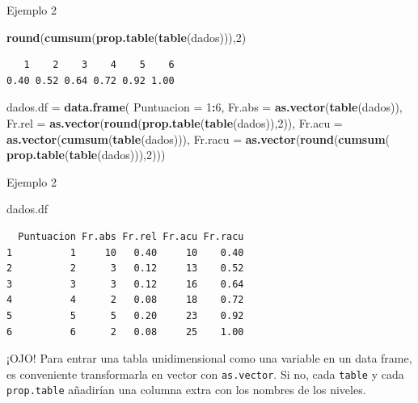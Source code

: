 \documentclass[
  ignorenonframetext,
  aspectratio=169]{beamer}
\newenvironment{Shaded}{\begin{snugshade}}{\end{snugshade}}
\newcommand{\AttributeTok}[1]{\textcolor[rgb]{0.13,0.29,0.53}{#1}}
\newcommand{\DecValTok}[1]{\textcolor[rgb]{0.00,0.00,0.81}{#1}}
\newcommand{\FunctionTok}[1]{\textcolor[rgb]{0.13,0.29,0.53}{\textbf{#1}}}
\newcommand{\NormalTok}[1]{#1}
\newcommand{\OtherTok}[1]{\textcolor[rgb]{0.56,0.35,0.01}{#1}}
\newcommand{\SpecialCharTok}[1]{\textcolor[rgb]{0.81,0.36,0.00}{\textbf{#1}}}
\begin{document}
\begin{frame}[fragile]{Ejemplo 2}
\label{ejemplo-2-4}
\begin{Shaded}
\begin{Highlighting}[]
\FunctionTok{round}\NormalTok{(}\FunctionTok{cumsum}\NormalTok{(}\FunctionTok{prop.table}\NormalTok{(}\FunctionTok{table}\NormalTok{(dados))),}\DecValTok{2}\NormalTok{)}
\end{Highlighting}
\end{Shaded}

\begin{verbatim}
   1    2    3    4    5    6 
0.40 0.52 0.64 0.72 0.92 1.00 
\end{verbatim}

\begin{Shaded}
\begin{Highlighting}[]
\NormalTok{dados.df }\OtherTok{=} \FunctionTok{data.frame}\NormalTok{(}
  \AttributeTok{Puntuacion =} \DecValTok{1}\SpecialCharTok{:}\DecValTok{6}\NormalTok{,}
  \AttributeTok{Fr.abs =} \FunctionTok{as.vector}\NormalTok{(}\FunctionTok{table}\NormalTok{(dados)),}
  \AttributeTok{Fr.rel =} \FunctionTok{as.vector}\NormalTok{(}\FunctionTok{round}\NormalTok{(}\FunctionTok{prop.table}\NormalTok{(}\FunctionTok{table}\NormalTok{(dados)),}\DecValTok{2}\NormalTok{)),}
  \AttributeTok{Fr.acu =} \FunctionTok{as.vector}\NormalTok{(}\FunctionTok{cumsum}\NormalTok{(}\FunctionTok{table}\NormalTok{(dados))),}
  \AttributeTok{Fr.racu =} \FunctionTok{as.vector}\NormalTok{(}\FunctionTok{round}\NormalTok{(}\FunctionTok{cumsum}\NormalTok{(}
    \FunctionTok{prop.table}\NormalTok{(}\FunctionTok{table}\NormalTok{(dados))),}\DecValTok{2}\NormalTok{)))}
\end{Highlighting}
\end{Shaded}
\end{frame}

\begin{frame}[fragile]{Ejemplo 2}
\label{ejemplo-2-5}
\begin{Shaded}
\begin{Highlighting}[]
\NormalTok{dados.df}
\end{Highlighting}
\end{Shaded}

\begin{verbatim}
  Puntuacion Fr.abs Fr.rel Fr.acu Fr.racu
1          1     10   0.40     10    0.40
2          2      3   0.12     13    0.52
3          3      3   0.12     16    0.64
4          4      2   0.08     18    0.72
5          5      5   0.20     23    0.92
6          6      2   0.08     25    1.00
\end{verbatim}

¡OJO! Para entrar una tabla unidimensional como una variable en un data
frame, es conveniente transformarla en vector con \texttt{as.vector}. Si
no, cada \texttt{table} y cada \texttt{prop.table} añadirían una columna
extra con los nombres de los niveles.
\end{frame}
\end{document}
